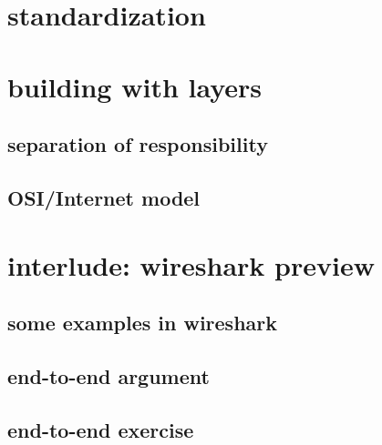 \section{standardization}


\section{building with layers}

\subsection{separation of responsibility}



\subsection{OSI/Internet model}



\section{interlude: wireshark preview}



\subsection{some examples in wireshark}


\subsection{end-to-end argument}


\subsection{end-to-end exercise}


